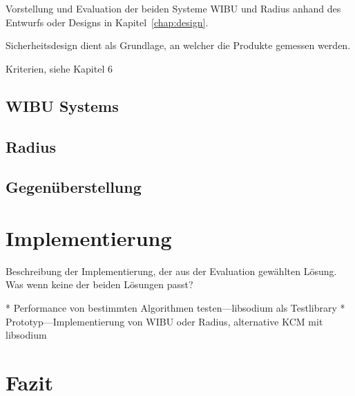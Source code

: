 \documentclass[11pt,a4paper]{report}
\begin{document}
Vorstellung und Evaluation der beiden Systeme WIBU und Radius anhand des Entwurfs oder Designs in Kapitel~\ref{chap:design}.

Sicherheitsdesign dient als Grundlage, an welcher die Produkte gemessen werden.

Kriterien, siehe Kapitel 6 \cite{walt}
                                            
\section{WIBU Systems}

\section{Radius}

\section{Gegenüberstellung}

\chapter{Implementierung} \label{chap:implementation}

Beschreibung der Implementierung, der aus der Evaluation gewählten Lösung. Was wenn keine der beiden Lösungen passt?

* Performance von bestimmten Algorithmen testen---libsodium als Testlibrary 
* Prototyp---Implementierung von WIBU oder Radius, alternative KCM mit libsodium

\chapter{Fazit}
\end{document}
